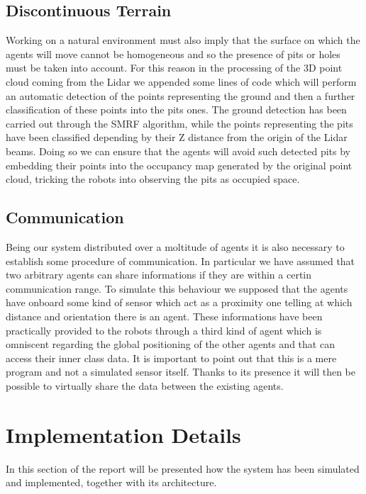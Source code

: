 \documentclass[twocolumn, a4paper]{article}
\begin{document}
\subsection{Discontinuous Terrain}
Working on a natural environment must also imply that the surface on which the
agents will move cannot be homogeneous and so the presence of pits or holes
must be taken into account.
For this reason in the processing of the 3D point cloud coming from the Lidar
we appended some lines of code which will perform an automatic detection
of the points representing the ground and then a further classification of
these points into the pits ones. The ground detection has been carried out 
through the SMRF algorithm, while the points representing the pits have
been classified depending by
their Z distance from the origin of the Lidar beams. Doing so we can ensure
that the agents will avoid such detected pits by embedding their points into
the occupancy map generated by the original point cloud, tricking the robots
into observing the pits as occupied space.

\subsection{Communication}
Being our system distributed over a moltitude of agents it is also necessary
to establish some procedure of communication. In particular we have assumed
that two arbitrary agents can share informations if they are within a certin
communication range. To simulate this behaviour we supposed that the agents
have onboard some kind of sensor which act as a proximity one telling at
which distance and orientation there is an agent. These informations have
been practically provided to the robots through a third kind of agent
which is omniscent regarding the global positioning of the other agents
and that can access their inner class data. It is important to point out
that this is a mere program and not a simulated sensor itself.
Thanks to its presence it will then be possible to virtually share the data
between the existing agents.

\section{Implementation Details}
In this section of the report will be presented how the system has been
simulated and implemented, together with its architecture.
\end{document}
